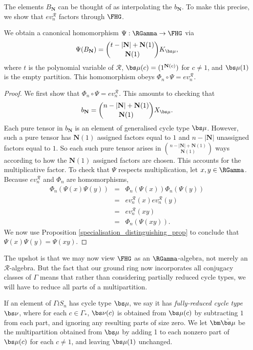 The elements $B_{\mathbf{N}}$ can be thought of as interpolating the $b_{\mathbf{N}}$. To make this precise, we show that $ev_n^{\mathcal{R}}$ factors through $\FHG$.

\begin{corollary} \label{coeff_compatibility_cor}
We obtain a canonical homomorphism $\Psi: \RGamma \to \FHG$ via
\[
\Psi( B_{\mathbf{N}}) = \binom{t - |\mathbf{N}| + \mathbf{N}(1)}{\mathbf{N}(1)} K_{\bs \mu},
\]
where $t$ is the polynomial variable of $\mathcal{R}$, $\bs \mu(c) = (1^{\mathbf{N}(c)})$ for $c \neq 1$, and $\bs \mu(1)$ is the empty partition. This homomorphism obeys $\Phi_n \circ \Psi = ev_n^{\mathcal{R}}$.
\end{corollary}
\begin{proof}
We first show that $\Phi_n \circ \Psi = ev_n^{\mathcal{R}}$. This amounts to checking that
\[
b_{\mathbf{N}} = \binom{n - |\mathbf{N}| + \mathbf{N}(1)}{\mathbf{N}(1)} X_{\bs \mu}.
\]
Each pure tensor in $b_{\mathbf{N}}$ is an element of generalised cycle type $\bs \mu$. However, such a pure tensor has $\mathbf{N}(1)$ assigned factors equal to $1$ and $n - |\mathbf{N}|$ unassigned factors equal to $1$. So each such pure tensor arises in $\binom{n - |\mathbf{N}| + \mathbf{N}(1)}{\mathbf{N}(1)}$ ways according to how the $\mathbf{N}(1)$ assigned factors are chosen. This accounts for the multiplicative factor. To check that $\Psi$ respects multiplication, let $x,y \in \RGamma$. Because $ev_n^{\mathcal{R}}$ and $\Phi_n$ are homomorphisms,
\begin{eqnarray*}
\Phi_n(\Psi(x)\Psi(y)) &=& \Phi_n(\Psi(x))\Phi_n(\Psi(y)) \\
&=& ev_n^{\mathcal{R}}(x) ev_n^{\mathcal{R}}(y) \\
&=& ev_n^{\mathcal{R}}(xy) \\
&=& \Phi_n(\Psi(xy)).
\end{eqnarray*}
We now use Proposition \ref{specialisation_distinguishing_prop} to conclude that $\Psi(x)\Psi(y) = \Psi(xy)$.
\end{proof}

The upshot is that we may now view $\FHG$ as an $\RGamma$-algebra, not merely an $\mathcal{R}$-algebra. But the fact that our ground ring now incorporates all conjugacy classes of $\Gamma$ means that rather than considering partially reduced cycle types, we will have to reduce all parts of a multipartition.
\begin{definition}
If an element of $\Gamma \wr S_n$ has cycle type $\bs \mu$, we say it has \emph{fully-reduced cycle type} $\bs \nu$, where for each $c \in \Gamma_*$, $\bs \nu(c)$ is obtained from $\bs \mu(c)$ by subtracting $1$ from each part, and ignoring any resulting parts of size zero. We let $\bm\hat{\bs \mu}$ be the multipartition obtained from $\bs \mu$ by adding 1 to each nonzero part of $\bs \mu(c)$ for each $c \neq 1$, and leaving $\bs \mu(1)$ unchanged.
\end{definition}

